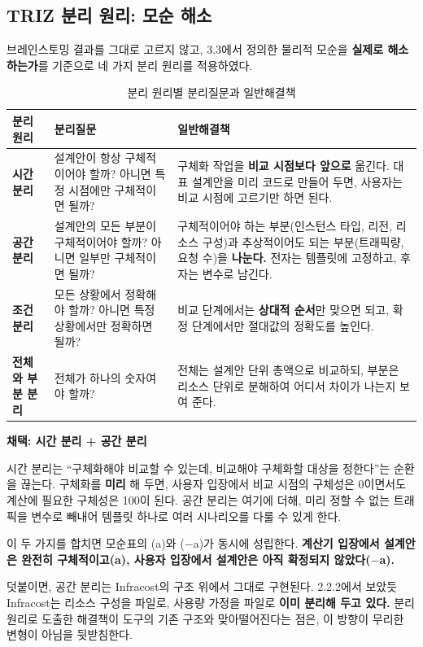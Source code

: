 \documentclass[10pt,a4paper]{article}
\newcommand{\code}[1]{\texttt{\detokenize{#1}}}
\begin{document}
\subsection{TRIZ 분리 원리: 모순 해소}

브레인스토밍 결과를 그대로 고르지 않고, 3.3에서 정의한 물리적 모순을 \textbf{실제로 해소하는가}를 기준으로 네 가지 분리 원리를 적용하였다.

\begin{table}[!h]
\centering
\caption{분리 원리별 분리질문과 일반해결책}
\label{tab:separation}
\footnotesize
\begin{tabularx}{\textwidth}{l Y Y}
\toprule
\textbf{분리원리} & \textbf{분리질문} & \textbf{일반해결책} \\
\midrule
\textbf{시간 분리} & 설계안이 항상 구체적이어야 할까? 아니면 특정 시점에만 구체적이면 될까? & 구체화 작업을 \textbf{비교 시점보다 앞으로} 옮긴다. 대표 설계안을 미리 코드로 만들어 두면, 사용자는 비교 시점에 고르기만 하면 된다. \\
\textbf{공간 분리} & 설계안의 모든 부분이 구체적이어야 할까? 아니면 일부만 구체적이면 될까? & 구체적이어야 하는 부분(인스턴스 타입, 리전, 리소스 구성)과 추상적이어도 되는 부분(트래픽량, 요청 수)을 \textbf{나눈다.} 전자는 템플릿에 고정하고, 후자는 변수로 남긴다. \\
\textbf{조건 분리} & 모든 상황에서 정확해야 할까? 아니면 특정 상황에서만 정확하면 될까? & 비교 단계에서는 \textbf{상대적 순서}만 맞으면 되고, 확정 단계에서만 절대값의 정확도를 높인다. \\
\textbf{전체와 부분 분리} & 전체가 하나의 숫자여야 할까? & 전체는 설계안 단위 총액으로 비교하되, 부분은 리소스 단위로 분해하여 어디서 차이가 나는지 보여 준다. \\
\bottomrule
\end{tabularx}
\end{table}

\textbf{채택: 시간 분리 + 공간 분리}

시간 분리는 ``구체화해야 비교할 수 있는데, 비교해야 구체화할 대상을 정한다''는 순환을 끊는다. 구체화를 \textbf{미리} 해 두면, 사용자 입장에서 비교 시점의 구체성은 0이면서도 계산에 필요한 구체성은 100이 된다. 공간 분리는 여기에 더해, 미리 정할 수 없는 트래픽을 변수로 빼내어 템플릿 하나로 여러 시나리오를 다룰 수 있게 한다.

이 두 가지를 합치면 모순표의 (a)와 ($-$a)가 동시에 성립한다. \textbf{계산기 입장에서 설계안은 완전히 구체적이고(a), 사용자 입장에서 설계안은 아직 확정되지 않았다($-$a).}

덧붙이면, 공간 분리는 Infracost의 구조 위에서 그대로 구현된다. 2.2.2에서 보았듯 Infracost는 리소스 구성을 \code{.tf} 파일로, 사용량 가정을 \code{infracost-usage.yml} 파일로 \textbf{이미 분리해 두고 있다.} 분리 원리로 도출한 해결책이 도구의 기존 구조와 맞아떨어진다는 점은, 이 방향이 무리한 변형이 아님을 뒷받침한다.
\end{document}
